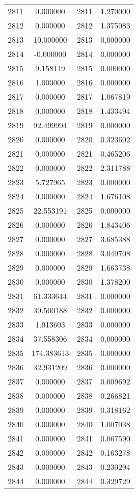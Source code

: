 \documentclass[12pt]{article}
\begin{document}
\begin{longtable}{@{}cccc@{}}
2811 & 0.000000 & 2811 & 1.270000 \\
2812 & 0.000000 & 2812 & 1.375083 \\
2813 & 10.000000 & 2813 & 0.000000 \\
2814 & -0.000000 & 2814 & 0.000000 \\
2815 & 9.158119 & 2815 & 0.000000 \\
2816 & 1.000000 & 2816 & 0.000000 \\
2817 & 0.000000 & 2817 & 1.067819 \\
2818 & 0.000000 & 2818 & 1.433494 \\
2819 & 92.499994 & 2819 & 0.000000 \\
2820 & 0.000000 & 2820 & 0.323602 \\
2821 & 0.000000 & 2821 & 0.465206 \\
2822 & 0.000000 & 2822 & 2.311788 \\
2823 & 5.727965 & 2823 & 0.000000 \\
2824 & 0.000000 & 2824 & 1.676108 \\
2825 & 22.553191 & 2825 & 0.000000 \\
2826 & 0.000000 & 2826 & 1.843406 \\
2827 & 0.000000 & 2827 & 3.685388 \\
2828 & 0.000000 & 2828 & 3.049708 \\
2829 & 0.000000 & 2829 & 1.663738 \\
2830 & 0.000000 & 2830 & 1.378200 \\
2831 & 61.333644 & 2831 & 0.000000 \\
2832 & 39.500188 & 2832 & 0.000000 \\
2833 & 1.913603 & 2833 & 0.000000 \\
2834 & 37.558306 & 2834 & 0.000000 \\
2835 & 174.383613 & 2835 & 0.000000 \\
2836 & 32.931209 & 2836 & 0.000000 \\
2837 & 0.000000 & 2837 & 0.009692 \\
2838 & 0.000000 & 2838 & 0.266821 \\
2839 & 0.000000 & 2839 & 0.318162 \\
2840 & 0.000000 & 2840 & 1.007038 \\
2841 & 0.000000 & 2841 & 0.067590 \\
2842 & 0.000000 & 2842 & 0.163278 \\
2843 & 0.000000 & 2843 & 0.230294 \\
2844 & 0.000000 & 2844 & 0.329729 \\

\end{longtable}
\end{document}
